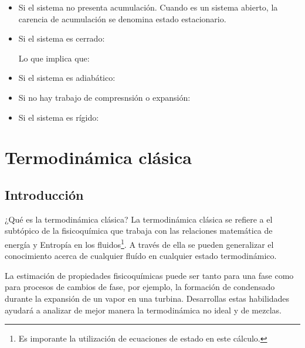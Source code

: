 \begin{itemize}
    \item Si el sistema no presenta acumulación. Cuando es un sistema abierto, la carencia de acumulación se denomina estado estacionario.

    \item Si el sistema es cerrado:
    
    Lo que implica que:
    \item Si el sistema es adiabático:
    

    \item Si no hay trabajo de compresnsión o expansión:
    

    \item Si el sistema es rígido:
    

\end{itemize}

\clearpage
\section{Termodinámica clásica}

\subsection{Introducción}

¿Qué es la termodinámica clásica? La termodinámica clásica se refiere a el subtópico de la fisicoquímica que trabaja con las relaciones matemática
de energía y Entropía en los fluidos\footnote{Es imporante la utilización de ecuaciones de estado en este cálculo.}. A través de ella se pueden generalizar el conocimiento acerca de cualquier fluído en cualquier estado termodinámico.

La estimación de propiedades fisicoquímicas puede ser tanto para una fase como para procesos de cambios de fase, por ejemplo, la formación de condensado durante la expansión de un vapor en una turbina. Desarrollas estas habilidades ayudará a analizar de mejor manera la termodinámica no ideal y de mezclas.


